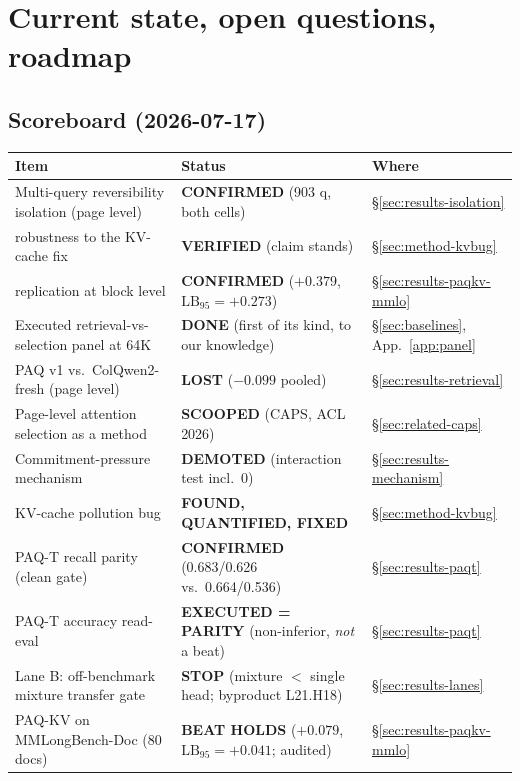 \documentclass[11pt,letterpaper]{article}
\newcommand{\paq}{\textsc{PAQ}}
\newcommand{\paqt}{\textsc{PAQ-T}}
\newcommand{\paqc}{\textsc{PAQ-KV}}
\newcommand{\lb}{\mathrm{LB}_{95}}
\begin{document}
\section{Current state, open questions, roadmap}\label{sec:roadmap}

\subsection{Scoreboard (2026-07-17)}
\begin{center}\small
\begin{tabular}{lll}
\toprule
Item & Status & Where \\
\midrule
Multi-query reversibility isolation (page level) & \textbf{CONFIRMED} (903 q, both cells) & \S\ref{sec:results-isolation} \\
\quad robustness to the KV-cache fix & \textbf{VERIFIED} (claim stands) & \S\ref{sec:method-kvbug} \\
\quad replication at block level & \textbf{CONFIRMED} ($+0.379$, $\lb=+0.273$) & \S\ref{sec:results-paqkv-mmlo} \\
Executed retrieval-vs-selection panel at 64K & \textbf{DONE} (first of its kind, to our knowledge) & \S\ref{sec:baselines}, App.~\ref{app:panel} \\
\paq{} v1 vs.\ ColQwen2-fresh (page level) & \textbf{LOST} ($-0.099$ pooled) & \S\ref{sec:results-retrieval} \\
Page-level attention selection as a method & \textbf{SCOOPED} (CAPS, ACL 2026) & \S\ref{sec:related-caps} \\
Commitment-pressure mechanism & \textbf{DEMOTED} (interaction test incl.\ 0) & \S\ref{sec:results-mechanism} \\
KV-cache pollution bug & \textbf{FOUND, QUANTIFIED, FIXED} & \S\ref{sec:method-kvbug} \\
\paqt{} recall parity (clean gate) & \textbf{CONFIRMED} (0.683/0.626 vs.\ 0.664/0.536) & \S\ref{sec:results-paqt} \\
\paqt{} accuracy read-eval & \textbf{EXECUTED = PARITY} (non-inferior, \emph{not} a beat) & \S\ref{sec:results-paqt} \\
Lane B: off-benchmark mixture transfer gate & \textbf{STOP} (mixture $<$ single head; byproduct L21.H18) & \S\ref{sec:results-lanes} \\
\paqc{} on MMLongBench-Doc (80 docs) & \textbf{BEAT HOLDS} ($+0.079$, $\lb=+0.041$; audited) & \S\ref{sec:results-paqkv-mmlo} \\

\end{tabular}
\end{center}
\end{document}
